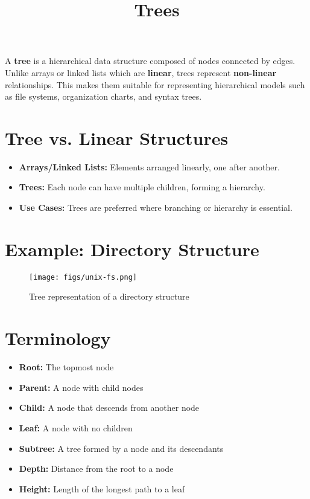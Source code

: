 \documentclass{article}
\title{Trees}
\author{}
\date{}
\begin{document}
\maketitle


A \textbf{tree} is a hierarchical data structure composed of nodes connected by edges. Unlike arrays or linked lists which are \textbf{linear}, trees represent \textbf{non-linear} relationships. This makes them suitable for representing hierarchical models such as file systems, organization charts, and syntax trees.

\section{Tree vs. Linear Structures}
\begin{itemize}
  \item \textbf{Arrays/Linked Lists:} Elements arranged linearly, one after another.
  \item \textbf{Trees:} Each node can have multiple children, forming a hierarchy.
  \item \textbf{Use Cases:} Trees are preferred where branching or hierarchy is essential.
\end{itemize}

\section{Example: Directory Structure}

\begin{figure}[h]
  \centering
  \texttt{[image: figs/unix-fs.png]}
  \caption{Tree representation of a directory structure}
  \label{fig:dir_tree}
\end{figure}

\section{Terminology}
\begin{itemize}
  \item \textbf{Root:} The topmost node
  \item \textbf{Parent:} A node with child nodes
  \item \textbf{Child:} A node that descends from another node
  \item \textbf{Leaf:} A node with no children
  \item \textbf{Subtree:} A tree formed by a node and its descendants
  \item \textbf{Depth:} Distance from the root to a node
  \item \textbf{Height:} Length of the longest path to a leaf
\end{itemize}
\end{document}
